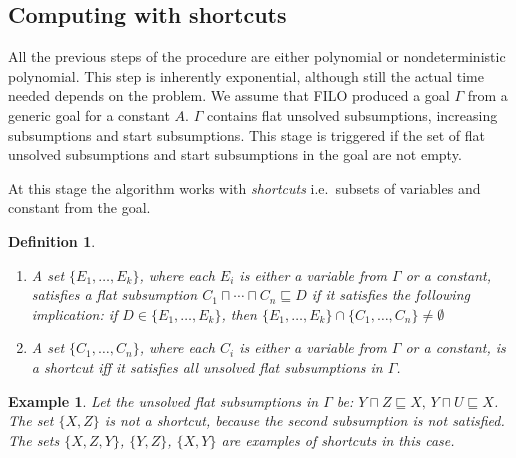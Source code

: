 \documentclass{article}
\newtheorem{example}{Example}
\newtheorem{definition}{Definition}
\newcommand{\barbara}[1]{\todo[inline, color=blue!40]{#1}}
\newcommand{\ie}{i.e.\ }
\begin{document}


\subsection{Computing with shortcuts}
All the previous steps of the procedure are either polynomial or nondeterministic polynomial. This
step is inherently exponential, although still the actual time needed depends on the problem.
We assume that FILO produced a goal $\Gamma$ from a generic goal for a constant $A$.
$\Gamma$ contains flat unsolved subsumptions, increasing subsumptions and start subsumptions.
This stage is triggered if the set of flat unsolved subsumptions and start subsumptions in the goal are not empty.

At this stage the algorithm works with \emph{shortcuts} \ie subsets of variables and constant from the goal.

\begin{definition}
	\begin{enumerate}
\item A set  $\{E_1, \dots, E_k\}$, where each $E_i$ is either a variable from  $\Gamma$ or a constant, \emph{satisfies}
a flat subsumption $C_1 \sqcap \cdots \sqcap C_n \sqsubseteq D$	if it satisfies the following implication:
if $D \in \{E_1, \dots, E_k\}$, then $\{E_1, \dots, E_k\} \cap \{C_1, \dots,C_n\} \not=\emptyset$
	
\item A set $\{C_1, \dots, C_n\}$, where each $C_i$ is either a variable from  $\Gamma$ or a constant, is 
a shortcut iff it \emph{satisfies} all unsolved flat subsumptions in $\Gamma$.
\end{enumerate}
\end{definition}
\begin{example}
	Let the unsolved flat subsumptions in $\Gamma$ be: $Y \sqcap Z \sqsubseteq X,\, Y \sqcap U \sqsubseteq X$.
	The set $\{X, Z \}$ is not a shortcut, because the second subsumption is not satisfied.
	The sets $\{X, Z, Y \}$, $\{Y, Z\}$, $\{X, Y\}$ are examples of shortcuts in this case.
\end{example}
%
\end{document}
